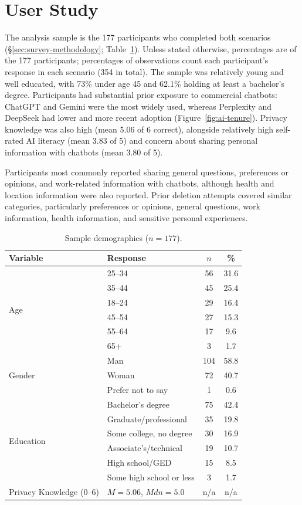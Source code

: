 \documentclass[conference,compsoc]{IEEEtran}
\begin{document}
\section{User Study}

\label{sec:sample-knowledge}

The analysis sample is the 177 participants who completed both scenarios
(\S\ref{sec:survey-methodology}; Table~\ref{tab:demographics}). Unless stated otherwise, percentages are of the 177 participants; percentages of observations count each participant's response in each scenario (354 in total). The sample was relatively young and well educated, with 73\% under age 45 and 62.1\% holding at least a bachelor's degree. Participants had substantial prior exposure to commercial chatbots: ChatGPT and Gemini were the most widely used, whereas Perplexity and DeepSeek had lower and more recent adoption (Figure~\ref{fig:ai-tenure}). Privacy knowledge was also high (mean 5.06 of 6 correct), alongside relatively high self-rated AI literacy (mean 3.83 of 5) and concern about sharing personal information with chatbots (mean 3.80 of 5).

Participants most commonly reported sharing general questions, preferences or opinions, and work-related information with chatbots, although health and location information were also reported. Prior deletion attempts covered similar categories, particularly preferences or opinions, general questions, work information, health information, and sensitive personal experiences.


\begin{table}[t]
\centering
\caption{Sample demographics ($n=177$).}
\label{tab:demographics}
\small
\setlength{\tabcolsep}{3.5pt}
\begin{tabular}{llcc}
\toprule
Variable & Response & $n$ & \% \\
\midrule
\multirow{6}{*}{Age}
 & 25--34 & 56 & 31.6 \\
 & 35--44 & 45 & 25.4 \\
 & 18--24 & 29 & 16.4 \\
 & 45--54 & 27 & 15.3 \\
 & 55--64 & 17 & 9.6 \\
 & 65+    & 3  & 1.7 \\
\midrule
\multirow{3}{*}{Gender}
 & Man               & 104 & 58.8 \\
 & Woman             & 72  & 40.7 \\
 & Prefer not to say & 1   & 0.6 \\
\midrule
\multirow{6}{*}{Education}
 & Bachelor's degree      & 75 & 42.4 \\
 & Graduate/professional  & 35 & 19.8 \\
 & Some college, no degree & 30 & 16.9 \\
 & Associate's/technical  & 19 & 10.7 \\
 & High school/GED        & 15 & 8.5 \\
 & Some high school or less & 3 & 1.7 \\
\midrule
Privacy Knowledge (0--6) & $M=5.06$, $Mdn=5.0$ & n/a & n/a \\
\bottomrule
\end{tabular}
\end{table}
\end{document}

